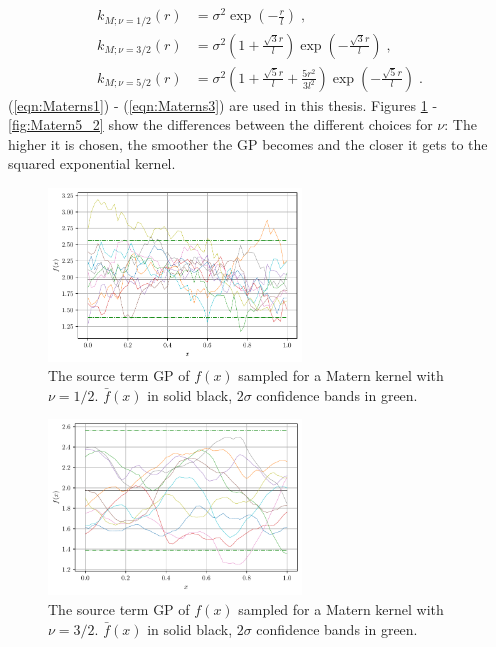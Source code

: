 \documentclass[%
  a4paper,oneside,%
  11pt,%
  smallchapters,
  green,%
  rgb, <cmyk>
  ,]{tubsbook}
\begin{document}
\begin{align}
k_{M;\nu = 1/2}(r) &=   \sigma^2 \exp(- \frac{r}{l})  \; , \\
\label{eqn:Materns1}
k_{M;\nu = 3/2}(r) &=  \sigma^2 \left(      1+ \frac{\sqrt{3}r}{l}  	\right)  \exp(- \frac{\sqrt{3} r}{l})  \; , \\
k_{M;\nu = 5/2}(r) &=  \sigma^2\left(      1+ \frac{\sqrt{5}r}{l}  + \frac{5r^2}{3l^2}	\right)  \exp(- \frac{\sqrt{5} r}{l}) \; .
\label{eqn:Materns3}
\end{align}
%
(\ref{eqn:Materns1}) - (\ref{eqn:Materns3}) are used in this thesis. Figures \ref{fig:Matern1_2} - \ref{fig:Matern5_2} show the differences between the different choices for $\nu$: The higher it is chosen, the smoother the GP becomes and the closer it gets to the squared exponential kernel.
\begin{figure}[h]
\begin{center}

\includegraphics[width=0.6\textwidth]{pics/matern1_2_f_sampled}
\caption{The source term GP of $f(x)$ sampled for a Matern kernel with $\nu=1/2$. $\bar{f}(x)$ in solid black, $2\sigma$ confidence bands in green.}
\label{fig:Matern1_2}

\end{center}
\end{figure}

\begin{figure}[h]
\begin{center}

\includegraphics[width=0.6\textwidth]{pics/matern3_2_f_sampled}
\caption{The source term GP of $f(x)$ sampled for a Matern kernel with $\nu=3/2$. $\bar{f}(x)$ in solid black, $2\sigma$ confidence bands in green.}
\label{fig:Matern3_2}

\end{center}
\end{figure}
\end{document}
